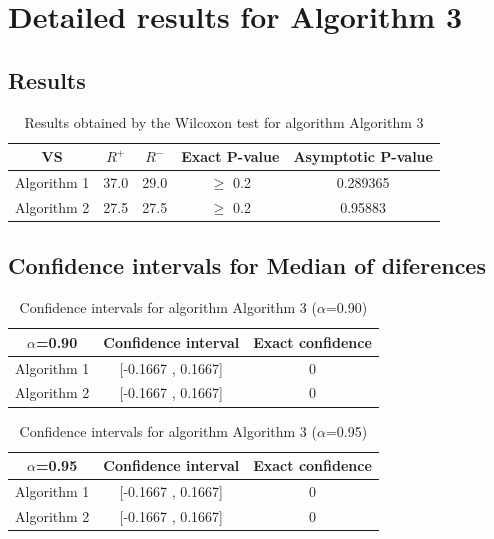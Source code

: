 \documentclass[a4paper,10pt]{article}
\begin{document}
 \clearpage 


\section{Detailed results for Algorithm 3}


\subsection{Results}

\begin{table}[!htp]
\centering\small
\begin{tabular}{
|c|c|c|c|c|}
\hline
 VS & $R^{+}$ & $R^{-}$ & Exact P-value & Asymptotic P-value \\ \hline 
Algorithm 1 & 37.0 & 29.0 & $\geq$ 0.2 & 0.289365\\ \hline 
Algorithm 2 & 27.5 & 27.5 & $\geq$ 0.2 & 0.95883\\ \hline 

\end{tabular}
\caption{Results obtained by the Wilcoxon test for algorithm Algorithm 3}
\end{table}

\subsection{Confidence intervals for Median of diferences}

\begin{table}[!htp]
\centering\small
\begin{tabular}{
|c|c|c|}
\hline
 $\alpha$=0.90 & Confidence interval & Exact confidence \\ \hline 
Algorithm 1 & [-0.1667 , 0.1667] & 0\\ \hline 
Algorithm 2 & [-0.1667 , 0.1667] & 0\\ \hline 

\end{tabular}
\caption{Confidence intervals for algorithm Algorithm 3 ($\alpha$=0.90)}
\end{table}
\begin{table}[!htp]
\centering\small
\begin{tabular}{
|c|c|c|}
\hline
 $\alpha$=0.95 & Confidence interval & Exact confidence \\ \hline 
Algorithm 1 & [-0.1667 , 0.1667] & 0\\ \hline 
Algorithm 2 & [-0.1667 , 0.1667] & 0\\ \hline 

\end{tabular}
\caption{Confidence intervals for algorithm Algorithm 3 ($\alpha$=0.95)}
\end{table}

 \clearpage 
\end{document}
